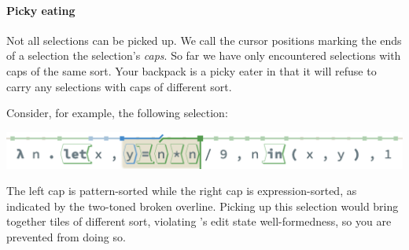 



\paragraph{Picky eating}
Not all selections can be picked up.
We call the cursor positions marking the ends of a selection
the selection's \emph{caps}.
So far we have only encountered selections with caps
of the same sort.
Your backpack is a picky eater in that
it will refuse to carry any selections with caps of
different sort.

Consider, for example, the following selection:

\begin{center}
  \includegraphics[width=\columnwidth]{img/broken-overline.png}
\end{center}


\noindent
The left cap is pattern-sorted while the right cap
is expression-sorted, as indicated by the two-toned
broken overline.
Picking up this selection would bring together
tiles of different sort, violating \tylr's edit
state well-formedness, so you are prevented from doing so.


